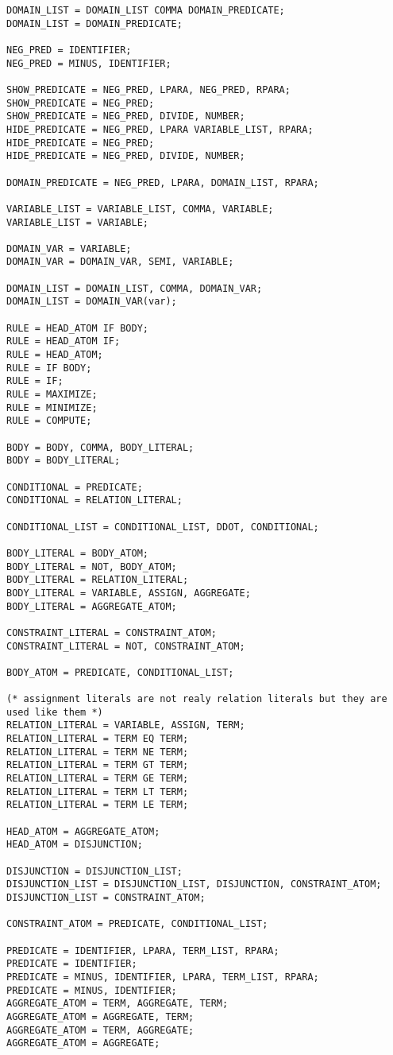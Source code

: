 \begin{verbatim}
DOMAIN_LIST = DOMAIN_LIST COMMA DOMAIN_PREDICATE;
DOMAIN_LIST = DOMAIN_PREDICATE;

NEG_PRED = IDENTIFIER;
NEG_PRED = MINUS, IDENTIFIER;

SHOW_PREDICATE = NEG_PRED, LPARA, NEG_PRED, RPARA;
SHOW_PREDICATE = NEG_PRED;
SHOW_PREDICATE = NEG_PRED, DIVIDE, NUMBER;
HIDE_PREDICATE = NEG_PRED, LPARA VARIABLE_LIST, RPARA;
HIDE_PREDICATE = NEG_PRED;
HIDE_PREDICATE = NEG_PRED, DIVIDE, NUMBER;

DOMAIN_PREDICATE = NEG_PRED, LPARA, DOMAIN_LIST, RPARA;

VARIABLE_LIST = VARIABLE_LIST, COMMA, VARIABLE;
VARIABLE_LIST = VARIABLE;

DOMAIN_VAR = VARIABLE;
DOMAIN_VAR = DOMAIN_VAR, SEMI, VARIABLE;

DOMAIN_LIST = DOMAIN_LIST, COMMA, DOMAIN_VAR;
DOMAIN_LIST = DOMAIN_VAR(var);

RULE = HEAD_ATOM IF BODY;
RULE = HEAD_ATOM IF;
RULE = HEAD_ATOM;
RULE = IF BODY;
RULE = IF;
RULE = MAXIMIZE;
RULE = MINIMIZE;
RULE = COMPUTE;

BODY = BODY, COMMA, BODY_LITERAL;
BODY = BODY_LITERAL;

CONDITIONAL = PREDICATE;
CONDITIONAL = RELATION_LITERAL;

CONDITIONAL_LIST = CONDITIONAL_LIST, DDOT, CONDITIONAL;

BODY_LITERAL = BODY_ATOM;
BODY_LITERAL = NOT, BODY_ATOM;
BODY_LITERAL = RELATION_LITERAL;
BODY_LITERAL = VARIABLE, ASSIGN, AGGREGATE;
BODY_LITERAL = AGGREGATE_ATOM;

CONSTRAINT_LITERAL = CONSTRAINT_ATOM;
CONSTRAINT_LITERAL = NOT, CONSTRAINT_ATOM;

BODY_ATOM = PREDICATE, CONDITIONAL_LIST;

(* assignment literals are not realy relation literals but they are used like them *)
RELATION_LITERAL = VARIABLE, ASSIGN, TERM;
RELATION_LITERAL = TERM EQ TERM;
RELATION_LITERAL = TERM NE TERM;
RELATION_LITERAL = TERM GT TERM;
RELATION_LITERAL = TERM GE TERM;
RELATION_LITERAL = TERM LT TERM;
RELATION_LITERAL = TERM LE TERM;

HEAD_ATOM = AGGREGATE_ATOM;
HEAD_ATOM = DISJUNCTION;

DISJUNCTION = DISJUNCTION_LIST;
DISJUNCTION_LIST = DISJUNCTION_LIST, DISJUNCTION, CONSTRAINT_ATOM;
DISJUNCTION_LIST = CONSTRAINT_ATOM;

CONSTRAINT_ATOM = PREDICATE, CONDITIONAL_LIST;

PREDICATE = IDENTIFIER, LPARA, TERM_LIST, RPARA;
PREDICATE = IDENTIFIER;
PREDICATE = MINUS, IDENTIFIER, LPARA, TERM_LIST, RPARA;
PREDICATE = MINUS, IDENTIFIER;
AGGREGATE_ATOM = TERM, AGGREGATE, TERM;
AGGREGATE_ATOM = AGGREGATE, TERM;
AGGREGATE_ATOM = TERM, AGGREGATE;
AGGREGATE_ATOM = AGGREGATE;


\end{verbatim}
